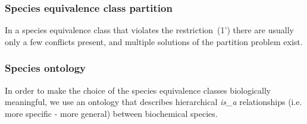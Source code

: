 \documentclass[9pt]{article}
\newcounter{pbm}
\newcounter{def}
\newcounter{rm}
\begin{document}
\subsubsection*{Species equivalence class partition}



In a species equivalence class that violates the restriction~(1') there are usually only a few conflicts present, and multiple solutions of the partition problem exist. 

\subsubsection*{Species ontology}
In order to make the choice of the species equivalence classes biologically meaningful, we use an ontology that describes hierarchical \textit{is\_a} relationships (i.e. more specific - more general) between biochemical species. %
\end{document}
